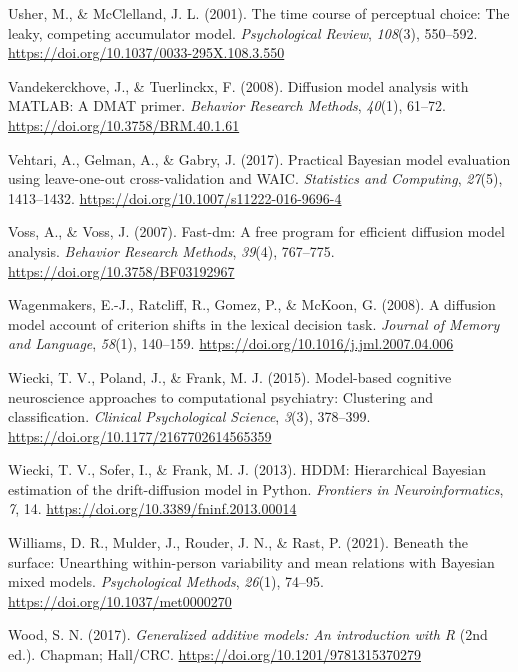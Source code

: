 \documentclass[
  jou,
  floatsintext,
  longtable,
  nolmodern,
  notxfonts,
  notimes,
  12pt,
  colorlinks=true,linkcolor=blue,citecolor=blue,urlcolor=blue]{apa7}
\newlength{\cslhangindent}
\newenvironment{CSLReferences}[2] %
 {\begin{list}{}{%
  \setlength{\itemindent}{0pt}
  \setlength{\leftmargin}{0pt}
  \setlength{\parsep}{0pt}
  \ifodd #1
   \setlength{\leftmargin}{\cslhangindent}
   \setlength{\itemindent}{-1\cslhangindent}
  \fi
  \setlength{\itemsep}{#2\baselineskip}}}
 {\end{list}}
\begin{document}
\begin{CSLReferences}{1}{0}
Usher, M., \& McClelland, J. L. (2001). The time course of perceptual
choice: The leaky, competing accumulator model. \emph{Psychological
Review}, \emph{108}(3), 550--592.
\url{https://doi.org/10.1037/0033-295X.108.3.550}

Vandekerckhove, J., \& Tuerlinckx, F. (2008). Diffusion model analysis
with {MATLAB}: A {DMAT} primer. \emph{Behavior Research Methods},
\emph{40}(1), 61--72. \url{https://doi.org/10.3758/BRM.40.1.61}

Vehtari, A., Gelman, A., \& Gabry, J. (2017). Practical {Bayesian} model
evaluation using leave-one-out cross-validation and {WAIC}.
\emph{Statistics and Computing}, \emph{27}(5), 1413--1432.
\url{https://doi.org/10.1007/s11222-016-9696-4}

Voss, A., \& Voss, J. (2007). Fast-dm: A free program for efficient
diffusion model analysis. \emph{Behavior Research Methods},
\emph{39}(4), 767--775. \url{https://doi.org/10.3758/BF03192967}

Wagenmakers, E.-J., Ratcliff, R., Gomez, P., \& McKoon, G. (2008). A
diffusion model account of criterion shifts in the lexical decision
task. \emph{Journal of Memory and Language}, \emph{58}(1), 140--159.
\url{https://doi.org/10.1016/j.jml.2007.04.006}

Wiecki, T. V., Poland, J., \& Frank, M. J. (2015). Model-based cognitive
neuroscience approaches to computational psychiatry: Clustering and
classification. \emph{Clinical Psychological Science}, \emph{3}(3),
378--399. \url{https://doi.org/10.1177/2167702614565359}

Wiecki, T. V., Sofer, I., \& Frank, M. J. (2013). {HDDM}: Hierarchical
{Bayesian} estimation of the drift-diffusion model in {Python}.
\emph{Frontiers in Neuroinformatics}, \emph{7}, 14.
\url{https://doi.org/10.3389/fninf.2013.00014}

Williams, D. R., Mulder, J., Rouder, J. N., \& Rast, P. (2021). Beneath
the surface: Unearthing within-person variability and mean relations
with {Bayesian} mixed models. \emph{Psychological Methods},
\emph{26}(1), 74--95. \url{https://doi.org/10.1037/met0000270}

Wood, S. N. (2017). \emph{Generalized additive models: An introduction
with {R}} (2nd ed.). Chapman; Hall/CRC.
\url{https://doi.org/10.1201/9781315370279}

\end{CSLReferences}
\end{document}
